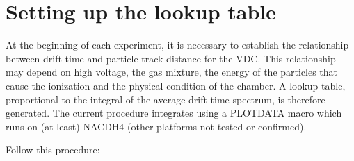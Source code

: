 \documentclass[11pt]{report}
\begin{document}
\section{Setting up the lookup table}\label{sec:Setting-up-the-Lookup-Table}

At the beginning of each experiment, it is necessary to establish the relationship between 
drift time and particle track distance for the VDC. This
relationship may depend on high voltage, the gas mixture, the energy of the particles
that cause the ionization and the physical condition of
the chamber.  A lookup table, proportional to the integral of the average drift
time spectrum, is therefore generated.  The current procedure integrates using
a PLOTDATA macro which runs on (at least) NACDH4 (other platforms not tested or confirmed).

Follow this procedure:
\end{document}
